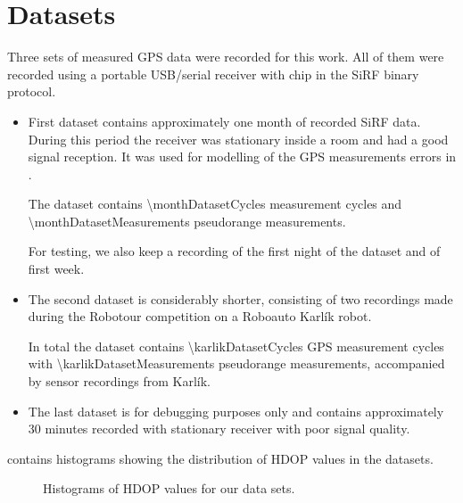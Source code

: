 \chapter{Datasets}
\label{chap:datasets}

Three sets of measured GPS data were recorded for this work.
All of them were recorded using a portable USB/serial receiver with \sirf chip
in the SiRF binary protocol.

\begin{itemize}

\item
First dataset contains approximately one month of recorded SiRF data.
During this period the receiver was stationary inside a room and had a good signal 
reception. 
It was used for modelling of the GPS measurements errors in .

The dataset contains \num{\monthDatasetCycles} measurement cycles and
\num{\monthDatasetMeasurements} pseudorange measurements.

For testing, we also keep a recording of the first night of the dataset and of first week.

\item
The second dataset is considerably shorter, consisting of two recordings made during
the Robotour competition \cite{robotour} on a Roboauto Karlík \cite{karlik} robot.

In total the dataset contains \num{\karlikDatasetCycles} GPS measurement cycles with
\num{\karlikDatasetMeasurements} pseudorange measurements, accompanied by sensor recordings from Karlík.

\item
The last dataset is for debugging purposes only and contains approximately
30 minutes recorded with stationary receiver with poor signal quality.

\end{itemize}

 contains histograms showing the distribution of HDOP values in the datasets.

\begin{figure}[htp]
	\centering
	\noindent{}
	\caption{Histograms of HDOP values for our data sets.}
	\label{fig:hdop-hist}
\end{figure}



